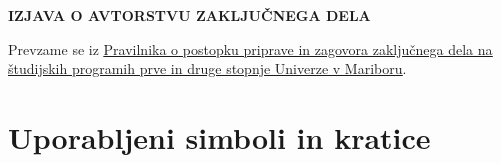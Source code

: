 \documentclass[openany, a4paper, 12pt]{book}
\begin{document}
\newpage
\begin{center}
    \textbf{IZJAVA O AVTORSTVU ZAKLJUČNEGA DELA}
\end{center}

Prevzame se iz \href{https://www.um.si/univerza/dokumentni-center/akti/GlavniDokumenti2013/Pravilnik\%20o\%20zaklj.\%20delih\%20na\%20\%C5\%A0P\%201.\%20in\%202.\%20st.\%20UM\%20(UPB\%201).pdf}{\ul{Pravilnika o postopku priprave in zagovora zaključnega dela na študijskih programih prve in druge stopnje Univerze v Mariboru}}.

\newpage
\let\cleardoublepage\clearpage
\tableofcontents

\newpage
\let\cleardoublepage\clearpage
{
\let\oldnumberline\numberline
\renewcommand{\numberline}{\figurename~\oldnumberline}
\renewcommand{\cftfigaftersnum}{: }
\listoffigures
}

\newpage
\let\cleardoublepage\clearpage
{
\let\oldnumberline\numberline
\renewcommand{\numberline}{\tablename~\oldnumberline}
\renewcommand{\cfttabaftersnum}{: }
\listoftables
}

\newpage
\let\cleardoublepage\clearpage
{
\listofalgorithms
}

\newpage
\chapter*{Uporabljeni simboli in kratice}

\vspace*{2.0cm}

\end{document}
